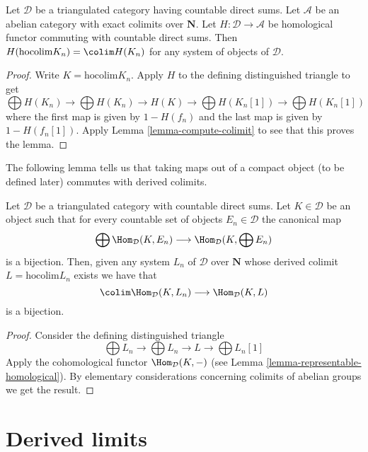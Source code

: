 \begin{lemma}
\label{lemma-cohomology-of-hocolim}
Let $\mathcal{D}$ be a triangulated category having countable
direct sums. Let $\mathcal{A}$ be an abelian category with exact
colimits over $\mathbf{N}$.
Let $H : \mathcal{D} \to \mathcal{A}$ be homological functor
commuting with countable direct sums.
Then $H(\text{hocolim} K_n) = \colim H(K_n)$
for any system of objects of $\mathcal{D}$.
\end{lemma}

\begin{proof}
Write $K = \text{hocolim} K_n$. Apply $H$ to the defining
distinguished triangle to get
$$
\bigoplus H(K_n) \to \bigoplus H(K_n)
\to H(K) \to
\bigoplus H(K_n[1]) \to \bigoplus H(K_n[1])
$$
where the first map is given by $1 - H(f_n)$ and the last map
is given by $1 - H(f_n[1])$.
Apply Lemma \ref{lemma-compute-colimit} to see that this proves the lemma.
\end{proof}

\noindent
The following lemma tells us that taking maps out of a compact
object (to be defined later) commutes with derived colimits.

\begin{lemma}
\label{lemma-commutes-with-countable-sums}
Let $\mathcal{D}$ be a triangulated category with countable direct sums.
Let $K \in \mathcal{D}$ be an object such that for every
countable set of objects $E_n \in \mathcal{D}$ the canonical map
$$
\bigoplus \Hom_\mathcal{D}(K, E_n)
\longrightarrow
\Hom_\mathcal{D}(K, \bigoplus E_n)
$$
is a bijection. Then, given any system $L_n$ of $\mathcal{D}$ over
$\mathbf{N}$ whose derived colimit $L = \text{hocolim} L_n$
exists we have that
$$
\colim \Hom_\mathcal{D}(K, L_n) \longrightarrow \Hom_\mathcal{D}(K, L)
$$
is a bijection.
\end{lemma}

\begin{proof}
Consider the defining distinguished triangle
$$
\bigoplus L_n \to \bigoplus L_n \to L \to \bigoplus L_n[1]
$$
Apply the cohomological functor $\Hom_\mathcal{D}(K, -)$
(see Lemma \ref{lemma-representable-homological}).
By elementary considerations concerning colimits of abelian groups
we get the result.
\end{proof}






\section{Derived limits}
\label{section-derived-limit}


